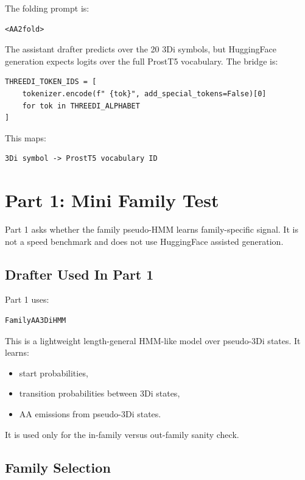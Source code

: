\documentclass[11pt,a4paper]{article}
\begin{document}
The folding prompt is:

\begin{verbatim}
<AA2fold>
\end{verbatim}

The assistant drafter predicts over the 20 3Di symbols, but HuggingFace generation expects logits over the full ProstT5 vocabulary. The bridge is:

\begin{verbatim}
THREEDI_TOKEN_IDS = [
    tokenizer.encode(f" {tok}", add_special_tokens=False)[0]
    for tok in THREEDI_ALPHABET
]
\end{verbatim}

This maps:

\begin{verbatim}
3Di symbol -> ProstT5 vocabulary ID
\end{verbatim}

\section{Part 1: Mini Family Test}

Part 1 asks whether the family pseudo-HMM learns family-specific signal. It is not a speed benchmark and does not use HuggingFace assisted generation.

\subsection{Drafter Used In Part 1}

Part 1 uses:

\begin{verbatim}
FamilyAA3DiHMM
\end{verbatim}

This is a lightweight length-general HMM-like model over pseudo-3Di states. It learns:

\begin{itemize}
  \item start probabilities,
  \item transition probabilities between 3Di states,
  \item AA emissions from pseudo-3Di states.
\end{itemize}

It is used only for the in-family versus out-family sanity check.

\subsection{Family Selection}
\end{document}
